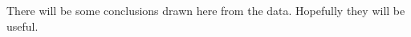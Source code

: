 \documentclass[../Paper.tex]{subfiles}
\begin{document}
There will be some conclusions drawn here from the data.
Hopefully they will be useful.
\clearpage
\end{document}
